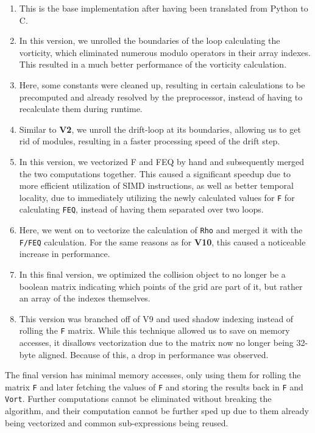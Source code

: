 \documentclass[letterpaper]{article}
\begin{document}
\begin{enumerate}[label=\textbf{V\arabic*:}]
    \item This is the base implementation after having been translated from Python to C.
    \item
    In this version, we unrolled the boundaries of the loop calculating the vorticity, which eliminated numerous modulo operators in their array indexes.
    This resulted in a much better performance of the vorticity calculation.
    \addtocounter{enumi}{5}
    \item
    Here, some constants were cleaned up, resulting in certain calculations to be precomputed and already resolved by the preprocessor, instead of having to recalculate them during runtime.
    \item Similar to \textbf{V2}, we unroll the drift-loop at its boundaries, allowing us to get rid of modules, resulting in a faster processing speed of the drift step.
    \item
    In this version, we vectorized F and FEQ by hand and subsequently merged the two computations together.
    This caused a significant speedup due to more efficient utilization of SIMD instructions, as well as better temporal locality, due to immediately utilizing the newly calculated values for \texttt{F} for calculating \texttt{FEQ}, instead of having them separated over two loops.
    \item
    Here, we went on to vectorize the calculation of \texttt{Rho} and merged it with the \texttt{F/FEQ} calculation.
    For the same reasons as for \textbf{V10}, this caused a noticeable increase in performance.
    \item
    In this final version, we optimized the collision object to no longer be a boolean matrix indicating which points of the grid are part of it, but rather an array of the indexes themselves.
    
    \item
    This version was branched off of V9 and used shadow indexing instead of rolling the \texttt{F} matrix.  
    While this technique allowed us to save on memory accesses, it disallows vectorization due to the matrix now no longer being 32-byte aligned. Because of this, a drop in performance was observed.
\end{enumerate}

The final version has minimal memory accesses, only using them for rolling the matrix \texttt{F} and later fetching the values of \texttt{F} and storing the results back in \texttt{F} and \texttt{Vort}.  
Further computations cannot be eliminated without breaking the algorithm, and their computation cannot be further sped up due to them already being vectorized and common sub-expressions being reused.  
\end{document}
